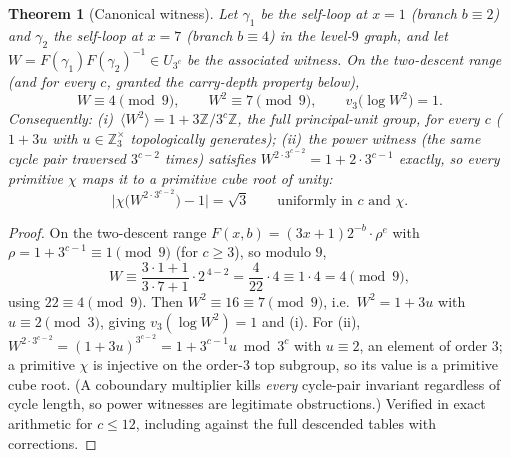 \documentclass[11pt]{article}
\newcommand{\Z}{\mathbb{Z}}
\theoremstyle{plain}
\newtheorem{theorem}{Theorem}
\theoremstyle{definition}
\theoremstyle{remark}
\begin{document}
\begin{theorem}[Canonical witness]\label{thm:witness}
Let $\gamma_1$ be the self-loop at $x=1$ (branch $b\equiv2$) and $\gamma_2$ the
self-loop at $x=7$ (branch $b\equiv4$) in the level-$9$ graph, and let
$W=F(\gamma_1)F(\gamma_2)^{-1}\in U_{3^c}$ be the associated witness. On the
two-descent range (and for every $c$, granted the carry-depth property below),
\[
W\equiv4\pmod9,\qquad W^2\equiv7\pmod9,\qquad v_3\bigl(\log W^2\bigr)=1 .
\]
Consequently:
(i)~$\langle W^2\rangle=1+3\Z/3^c\Z$, the full principal-unit group, for every
$c$ ($1+3u$ with $u\in\Z_3^\times$ topologically generates);
(ii)~the power witness (the same cycle pair traversed $3^{c-2}$ times)
satisfies $W^{2\cdot3^{c-2}}=1+2\cdot3^{c-1}$ exactly, so \emph{every} primitive
$\chi$ maps it to a primitive cube root of unity:
\[
\bigl|\chi\bigl(W^{2\cdot3^{c-2}}\bigr)-1\bigr|=\sqrt3
\qquad\text{uniformly in }c\text{ and }\chi .
\]
\end{theorem}
\begin{proof}
On the two-descent range $F(x,b)=(3x+1)2^{-b}\cdot\rho^{e}$ with
$\rho=1+3^{c-1}\equiv1\pmod9$ (for $c\ge3$), so modulo $9$,
\[
W\equiv\frac{3\cdot1+1}{3\cdot7+1}\cdot2^{\,4-2}
=\frac{4}{22}\cdot4\equiv1\cdot4=4\pmod 9,
\]
using $22\equiv4\pmod9$. Then $W^2\equiv16\equiv7\pmod9$, i.e.\
$W^2=1+3u$ with $u\equiv2\pmod3$, giving $v_3(\log W^2)=1$ and (i). For (ii),
$W^{2\cdot3^{c-2}}=(1+3u)^{3^{c-2}}=1+3^{c-1}u\bmod 3^c$ with
$u\equiv2$, an element of order $3$; a primitive $\chi$ is injective on the
order-$3$ top subgroup, so its value is a primitive cube root. (A coboundary
multiplier kills \emph{every} cycle-pair invariant regardless of cycle length,
so power witnesses are legitimate obstructions.) Verified in exact arithmetic
for $c\le12$, including against the full descended tables with corrections.
\end{proof}
\end{document}
